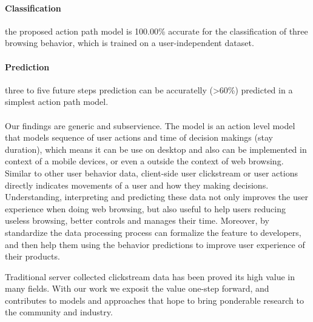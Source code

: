 \paragraph{Classification} the proposed action path model is 100.00\% accurate for 
the classification of three browsing behavior, which is trained on a user-independent dataset.
\paragraph{Prediction} three to five future steps prediction can be accuratelly (>60\%) predicted
in a simplest action path model.

\paragraph{}

Our findings are generic and subservience. The model is an action level model that models
sequence of user actions and time of decision makings (stay duration), which means it
can be use on desktop and also can be implemented in context of a mobile devices, 
or even a outside the context of web browsing.
Similar to other user behavior data, client-side user clickstream or user actions 
directly indicates movements of a user and how they making decisions. Understanding, 
interpreting and predicting these data not only improves the user experience when doing
web browsing, but also useful to help users reducing useless browsing, better controls 
and manages their time. Moreover, by standardize the data processing process can formalize
the feature to developers, and then help them using the behavior predictions to
improve user experience of their products.

Traditional server collected clickstream data has been proved its high value in many 
fields. With our work we exposit the value one-step forward, and contributes to models 
and approaches that hope to bring ponderable research to the community and industry.

\cleardoublepage